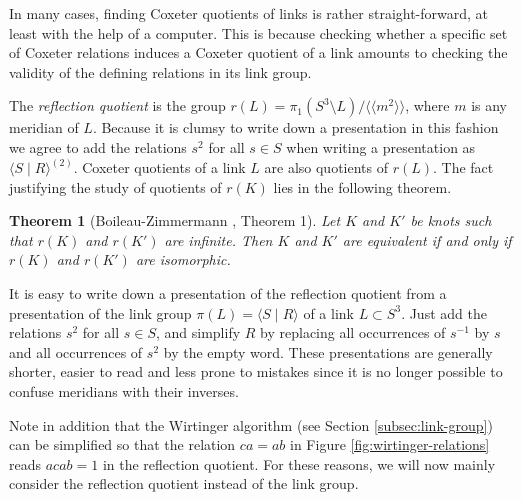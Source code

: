 \documentclass{article}
\newtheorem{theorem}{Theorem}[section]
\theoremstyle{definition}
\begin{document}
In many cases, finding Coxeter quotients of links is rather straight-forward, at least with the help of a computer. This is because checking whether a specific set of Coxeter relations induces a Coxeter quotient of a link amounts to checking the validity of the defining relations in its link group.

The \textit{reflection quotient} is the group $r(L) = \pi_1(S^3 \setminus L) / \langle \langle m^2 \rangle \rangle$, where $m$ is any meridian of $L$. Because it is clumsy to write down a presentation in this fashion we agree to add the relations $s^2$ for all $s \in S$ when writing a presentation as $\langle S \; | \; R \rangle^{(2)}$. Coxeter quotients of a link $L$ are also quotients of $r(L)$. The fact justifying the study of quotients of $r(K)$ lies in the following theorem.

\begin{theorem}[Boileau-Zimmermann \cite{boileau1989}, Theorem 1]
Let $K$ and $K'$ be knots such that $r(K)$ and $r(K')$ are infinite. Then $K$ and $K'$ are equivalent if and only if $r(K)$ and $r(K')$ are isomorphic.
\end{theorem}

It is easy to write down a presentation of the reflection quotient from a presentation of the link group $\pi(L) = \langle S \; | \; R \rangle$ of a link $L \subset S^3$. Just add the relations $s^2$ for all $s \in S$, and simplify $R$ by replacing all occurrences of $s^{-1}$ by $s$ and all occurrences of $s^2$ by the empty word. These presentations are generally shorter, easier to read and less prone to mistakes since it is no longer possible to confuse meridians with their inverses.

Note in addition that the Wirtinger algorithm (see Section \ref{subsec:link-group}) can be simplified so that the relation $ca = ab$ in Figure \ref{fig:wirtinger-relations} reads $acab = 1$ in the reflection quotient.
For these reasons, we will now mainly consider the reflection quotient instead of the link group.
\end{document}
